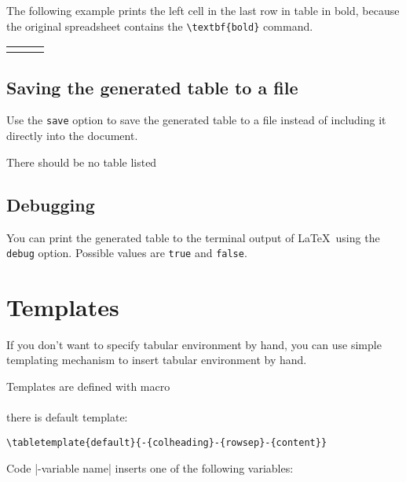 \documentclass{ltxdoc}
\begin{document}
The following example prints the left cell in the last row in table in bold, because the original 
spreadsheet contains the \verb|\textbf{bold}| command.

\begin{LTXexample}
\begin{tabular}{lll}
\end{tabular}     
\end{LTXexample}

\subsection{Saving the generated table to a file}

Use the \texttt{save} option to save the generated table to a file instead of including it directly into the document.

\begin{LTXexample}
There should be no table listed
\end{LTXexample}

\subsection{Debugging}

You can print the generated table to the terminal output of \LaTeX\ using the \texttt{debug} option. Possible values are 
\texttt{true} and \texttt{false}.


\section{Templates}\label{sec:tpl}

If you don't want to specify tabular environment by hand, you can use simple templating mechanism to insert tabular environment by hand. 

Templates are defined with macro\marginpar{\cmd{\tabletemplate}}\\ 
\cmd{\tabletemplate}\\
there is default template:
\begin{verbatim}
\tabletemplate{default}{-{colheading}-{rowsep}-{content}}
\end{verbatim}

Code |-{variable name}| inserts one of the following variables:
\end{document}
